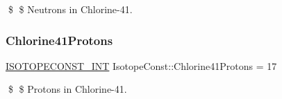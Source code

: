 \$ \$ Neutrons in Chlorine-\/41. \mbox{\label{group___isotope_const-_chlorine-_cl41_ga52c18c4fc63b2d8b0b0d19fc27fe2243}} 
\subsubsection{\texorpdfstring{Chlorine41\+Protons}{Chlorine41Protons}}
{\footnotesize\ttfamily \mbox{\hyperlink{group___isotope_const-_macros_ga5f18360b3e99483a35c32d789e62621c}{I\+S\+O\+T\+O\+P\+E\+C\+O\+N\+S\+T\+\_\+\+I\+NT}} Isotope\+Const\+::\+Chlorine41\+Protons = 17}

\$ \$ Protons in Chlorine-\/41. 